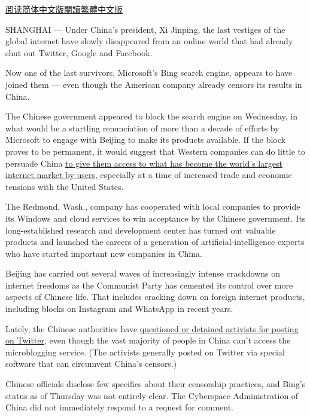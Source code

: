 \href{https://cn.nytimes.com/business/20190124/china-microsoft-bing/}{阅读简体中文版}\href{https://cn.nytimes.com/business/20190124/china-microsoft-bing/zh-hant/}{閱讀繁體中文版}

SHANGHAI --- Under China's president, Xi Jinping, the last vestiges of
the global internet have slowly disappeared from an online world that
had already shut out Twitter, Google and Facebook.

Now one of the last survivors, Microsoft's Bing search engine, appears
to have joined them --- even though the American company already censors
its results in China.

The Chinese government appeared to block the search engine on Wednesday,
in what would be a startling renunciation of more than a decade of
efforts by Microsoft to engage with Beijing to make its products
available. If the block proves to be permanent, it would suggest that
Western companies can do little to persuade China
\href{https://www.nytimes.com/2018/03/23/technology/trump-china-tariffs-tech-cold-war.html}{to
give them access to what has become the world's largest internet market
by users}, especially at a time of increased trade and economic tensions
with the United States.

The Redmond, Wash., company has cooperated with local companies to
provide its Windows and cloud services to win acceptance by the Chinese
government. Its long-established research and development center has
turned out valuable products and launched the careers of a generation of
artificial-intelligence experts who have started important new companies
in China.

Beijing has carried out several waves of increasingly intense crackdowns
on internet freedoms as the Communist Party has cemented its control
over more aspects of Chinese life. That includes cracking down on
foreign internet products, including blocks on Instagram and WhatsApp in
recent years.

Lately, the Chinese authorities have
\href{https://www.nytimes.com/2019/01/10/business/china-twitter-censorship-online.html}{questioned
or detained activists for posting on Twitter}, even though the vast
majority of people in China can't access the microblogging service. (The
activists generally posted on Twitter via special software that can
circumvent China's censors.)

Chinese officials disclose few specifics about their censorship
practices, and Bing's status as of Thursday was not entirely clear. The
Cyberspace Administration of China did not immediately respond to a
request for comment.


